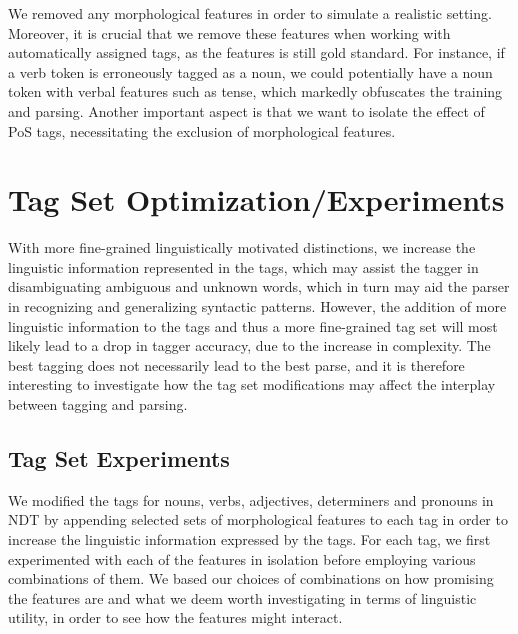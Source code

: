 \documentclass[11pt,a4paper]{article}
\begin{document}
We removed any morphological features in order to simulate a realistic setting.
Moreover, it is crucial that we remove these features when working with
automatically assigned tags, as the features is still gold standard.  For
instance, if a verb token is erroneously tagged as a noun, we could potentially
have a noun token with verbal features such as tense, which markedly obfuscates
the training and parsing. Another important aspect is that we want to isolate
the effect of PoS tags, necessitating the exclusion of morphological features.


\section{Tag Set Optimization/Experiments}
\label{sec:optimization}
With more fine-grained linguistically
motivated distinctions, we increase the linguistic information represented in
the tags, which may assist the tagger in disambiguating ambiguous and unknown
words, which in turn may aid the parser in recognizing and generalizing
syntactic patterns. However, the addition of more linguistic information to the
tags and thus a more fine-grained tag set will most likely lead to a drop in
tagger accuracy, due to the increase in complexity. The best tagging does not
necessarily lead to the best parse, and it is therefore interesting to
investigate how the tag set modifications may affect the interplay between
tagging and parsing.

\subsection{Tag Set Experiments}
We modified the tags for nouns, verbs, adjectives, determiners and pronouns in
NDT by appending selected sets of morphological features to each tag in order
to increase the linguistic information expressed by the tags.  For each tag, we
first experimented with each of the features in isolation before employing
various combinations of them. We based our choices of combinations on how
promising the features are and what we deem worth investigating in terms of
linguistic utility, in order to see how the features might interact.
\end{document}
